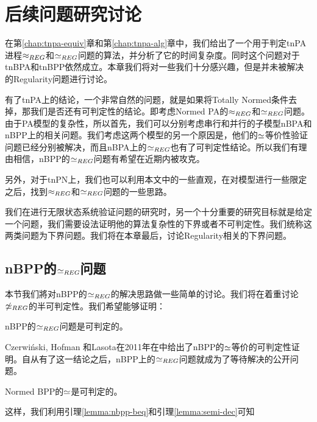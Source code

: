 \chapter{后续问题研究讨论}
\label{chap:fut}

在第\ref{chap:tnpa-equiv}章和第\ref{chap:tnpa-alg}章中，我们给出了一个用于判定tnPA进程$\approx_{REG}$和$\simeq_{REG}$问题的算法，并分析了它的时间复杂度。同时这个问题对于tnBPA和tnBPP依然成立。本章我们将对一些我们十分感兴趣，但是并未被解决的Regularity问题进行讨论。

有了tnPA上的结论，一个非常自然的问题，就是如果将Totally Normed条件去掉，那我们是否还有可判定性的结论。即考虑Normed PA的$\approx_{REG}$和$\simeq_{REG}$问题。由于PA模型的复杂性，所以首先，我们可以分别考虑串行和并行的子模型nBPA和nBPP上的相关问题。我们考虑这两个模型的另一个原因是，他们的$\simeq$等价性验证问题已经分别被解决\cite{CzerwiAski2011,Fu2013}，而且nBPA上的$\simeq_{REG}$也有了可判定性结论\cite{Fu2013}。所以我们有理由相信，nBPP的$\simeq_{REG}$问题有希望在近期内被攻克。

另外，对于tnPN上，我们也可以利用本文中的一些直观，在对模型进行一些限定之后，找到$\approx_{REG}$和$\simeq_{REG}$问题的一些思路。

我们在进行无限状态系统验证问题的研究时，另一个十分重要的研究目标就是给定一个问题，我们需要设法证明他的算法复杂性的下界或者不可判定性。我们统称这两类问题为下界问题。我们将在本章最后，讨论Regularity相关的下界问题。

\section{nBPP的$\simeq_{REG}$问题}
\label{sec:nbpp}

本节我们將对nBPP的$\simeq_{REG}$的解决思路做一些简单的讨论。我们将在着重讨论$\not\simeq_{REG}$的半可判定性。我们希望能够证明：

\begin{conj}\label{conj:nbpp-reg}
nBPP的$\simeq_{REG}$问题是可判定的。
\end{conj}

Czerwi{\'n}ski, Hofman 和Lasota在2011年在\cite{CzerwiAski2011}中给出了nBPP的$\simeq$等价的可判定性证明。自从有了这一结论之后，nBPP上的$\simeq_{REG}$问题就成为了等待解决的公开问题。

\begin{lem}\label{lemma:nbpp-beq}
Normed BPP的$\simeq$是可判定的。
\end{lem}

这样，我们利用引理\ref{lemma:nbpp-beq}和引理\ref{lemma:semi-dec}可知

